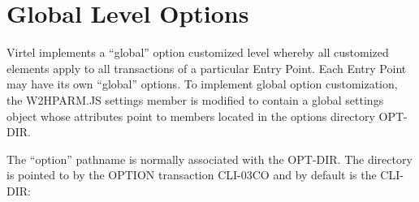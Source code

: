 \documentclass[letterpaper,10pt,english]{sphinxmanual}
\begin{document}
\ignorespaces 

\section{Global Level Options}
\label{\detokenize{Customization:global-level-options}}\label{\detokenize{Customization:index-4}}
Virtel implements a “global” option customized level whereby all customized elements apply to all transactions of a particular Entry Point. Each Entry Point may have its own “global” options. To implement global option customization, the W2HPARM.JS settings member is modified to contain a global settings object whose attributes point to members located in the options directory OPT-DIR.

\begin{sphinxVerbatim}[commandchars=\\\{\}]
   
         
         
         
\end{sphinxVerbatim}

The “option” pathname is normally associated with the OPT-DIR. The directory is pointed to by the OPTION transaction CLI-03CO and by default is the CLI-DIR:


\end{document}
